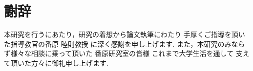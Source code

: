 \chapter*{謝辞}

本研究を行うにあたり，研究の着想から論文執筆にわたり
手厚くご指導を頂いた指導教官の番原 睦則教授
に深く感謝を申し上げます.
また，本研究のみならず様々な相談に乗って頂いた
番原研究室の皆様
これまで大学生活を通して
支えて頂いた方々に御礼申し上げます.

